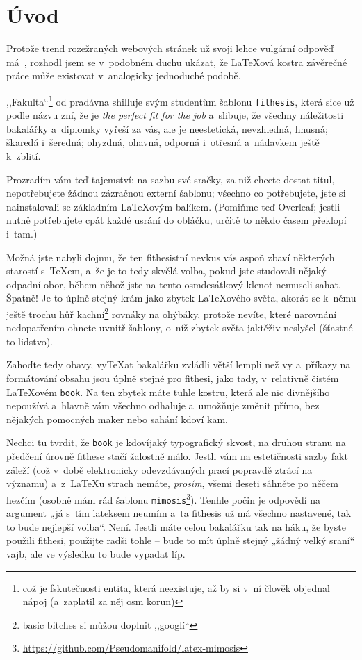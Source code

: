 \chapter{Úvod}

Protože trend rozežraných webových stránek už svoji lehce vulgární odpověď
má~\cite{web:mf}, rozhodl jsem se v~podobném duchu ukázat, že \LaTeX ová kostra
závěrečné práce může existovat v~analogicky jednoduché podobě.

,,Fakulta``\footnote{což je fskutečnosti entita, která neexistuje, až by si
v~ní člověk objednal nápoj (a~zaplatil za něj osm korun)} od pradávna
shilluje svým studentům šablonu \texttt{fithesis}, která sice už podle názvu
zní, že je \emph{the perfect fit for the job} a~slibuje, že všechny náležitosti
bakalářky a~diplomky vyřeší za vás, ale je neestetická, nevzhledná, hnusná;
škaredá i~šeredná; ohyzdná, ohavná, odporná i~otřesná a~nádavkem ještě k~zblití.

Prozradím vám teď tajemství: na sazbu své sračky, za niž chcete dostat titul,
nepotřebujete žádnou zázračnou externí šablonu; všechno co potřebujete, jste si
nainstalovali se základním \LaTeX ovým balíkem. (Pomiňme teď Overleaf; jestli
nutně potřebujete cpát každé usrání do obláčku, určitě to někdo časem překlopí
i~tam.)

Možná jste nabyli dojmu, že ten fithesistní nevkus vás aspoň zbaví některých
starostí s~\TeX em, a~že je to tedy skvělá volba, pokud jste studovali nějaký
odpadní obor, během něhož jste na tento osmdesátkový klenot nemuseli sahat.
Špatně! Je to úplně stejný krám jako zbytek \LaTeX ového světa, akorát se k~němu
ještě trochu hůř kachní\footnote{basic bitches si můžou doplnit ,,googlí``}
rovnáky na ohýbáky, protože nevíte, které narovnání nedopatřením ohnete uvnitř
šablony, o~níž zbytek světa jaktěživ neslyšel (šťastné to lidstvo).

Zahoďte tedy obavy, vy\TeX at bakalářku zvládli větší lempli než vy a~příkazy na
formátování obsahu jsou úplně stejné pro fithesi, jako tady, v~relativně čistém
\LaTeX ovém \texttt{book}. Na ten zbytek máte tuhle kostru, která ale nic
divnějšího nepoužívá a~hlavně vám všechno odhaluje a~umožňuje změnit přímo, bez
nějakých pomocných maker nebo sahání kdoví kam.

Nechci tu tvrdit, že \texttt{book} je kdovíjaký typografický skvost, na druhou
stranu na předčení úrovně fithese stačí žalostně málo. Jestli vám na
estetičnosti sazby fakt záleží (což v~době elektronicky odevzdávaných prací
popravdě ztrácí na významu) a~z~\LaTeX u strach nemáte, \emph{prosím}, všemi
deseti sáhněte po něčem hezčím (osobně mám rád šablonu
\texttt{mimosis}\footnote{\url{https://github.com/Pseudomanifold/latex-mimosis}}).
Tenhle počin je odpovědí na argument „já s~tím lateksem neumím a~ta fithesis už
má všechno nastavené, tak to bude nejlepší volba“. Není. Jestli máte celou
bakalářku tak na háku, že byste použili fithesi, použijte radši tohle -- bude to
mít úplně stejný „žádný velký sraní“ vajb, ale ve výsledku to bude  vypadat líp.
